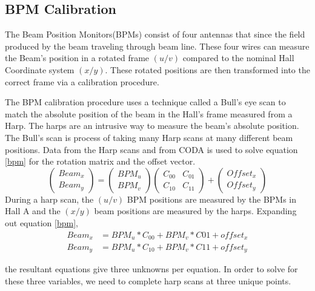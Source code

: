 \subsection{BPM Calibration}

The Beam Position Monitors(BPMs) consist of four antennas that since the field produced by the beam traveling through beam line. These four wires can measure the Beam's position in a rotated frame $ (u/v) $ compared to the nominal Hall Coordinate system $(x/y)$. These rotated positions are then transformed into the correct frame via a calibration procedure. 

The BPM calibration procedure uses a technique called a Bull's eye scan to match the absolute position of the beam in the Hall's frame measured from a Harp. The harps are an intrusive way to measure the beam's absolute position.  The Bull's scan is process of taking many Harp scans at many different beam positions. Data from the Harp scans and from CODA is used to solve equation \ref{bpm} for the rotation matrix and the offset vector.
\begin{equation}
\begin{pmatrix} Beam_x \\ Beam_y \end{pmatrix} =
\begin{pmatrix} BPM_u \\ BPM_v \end{pmatrix} 
\begin{pmatrix} C_{00} & C_{01} \\ C_{10} & C_{11} \end{pmatrix} +
\begin{pmatrix} Offset_x \\ Offset_y \end{pmatrix}  \label{bpm}
\end{equation}
During a harp scan, the $(u/v)$ BPM positions are measured by the BPMs in Hall A and the $(x/y)$ beam positions are measured by the harps. Expanding out equation \ref{bpm}, 
\begin{align}
Beam_x &= BPM_u*C_{00} + BPM_v*C{01} + offset_x \label{bpi}\\
Beam_y &= BPM_u*C_{10} + BPM_v*C{11} + offset_y \nonumber
\end{align}

the resultant equations give three unknowns per equation. In order to solve for these three variables, we need to complete harp scans at three unique points.
